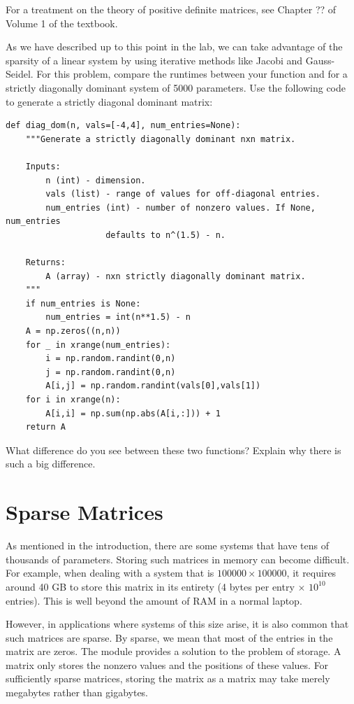 For a treatment on the theory of positive definite matrices, see Chapter ?? of
Volume 1 of the textbook.

\begin{problem}
As we have described up to this point in the lab, we can take advantage of the
sparsity of a linear system by using iterative methods like Jacobi and Gauss-Seidel.
For this problem, compare the runtimes between your  function and
 for a strictly diagonally dominant system of 5000 parameters. Use the following
code to generate a strictly diagonal dominant matrix:
\begin{lstlisting}
def diag_dom(n, vals=[-4,4], num_entries=None):
    """Generate a strictly diagonally dominant nxn matrix.

    Inputs:
        n (int) - dimension.
        vals (list) - range of values for off-diagonal entries.
        num_entries (int) - number of nonzero values. If None, num_entries
                    defaults to n^(1.5) - n. 

    Returns:
        A (array) - nxn strictly diagonally dominant matrix.
    """
    if num_entries is None:
        num_entries = int(n**1.5) - n
    A = np.zeros((n,n))
    for _ in xrange(num_entries):
        i = np.random.randint(0,n)
        j = np.random.randint(0,n)
        A[i,j] = np.random.randint(vals[0],vals[1])
    for i in xrange(n):
        A[i,i] = np.sum(np.abs(A[i,:])) + 1
    return A
\end{lstlisting}
What difference do you see between these two functions? Explain why there is such a big difference.
\end{problem}

\section*{Sparse Matrices}
As mentioned in the introduction, there are some systems that have tens of
thousands of parameters. Storing such matrices in memory can become difficult.
For example, when dealing with a system that is $100000 \times 100000$, it
requires around 40 GB to store this matrix in its entirety (4 bytes per entry
$\times$ $10^{10}$ entries). This is well beyond the amount of RAM in a normal
laptop.

However, in applications where systems of this size arise, it is also common
that such matrices are sparse. By sparse, we mean that most of the entries in
the matrix are zeros. The  module provides a solution to the
problem of storage. A  matrix only stores the nonzero values and the positions
of these values. For sufficiently sparse matrices, storing the matrix as a
 matrix may take merely megabytes rather than gigabytes.

